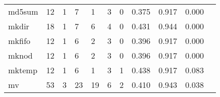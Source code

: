 \begin{longtable}{lp{1.2cm}p{1.2cm}p{1.2cm}p{1.2cm}p{1.2cm}p{1.2cm}p{1.2cm}p{1.2cm}p{1.2cm}p{1.2cm}}
md5sum    &                                    12 &                                                  1 &                                                  7 &                                                  1 &                                                  3 &                                                  0 &                                         0.375 &                                              0.917 &                                              0.000 \\
mkdir     &                                    18 &                                                  1 &                                                  7 &                                                  6 &                                                  4 &                                                  0 &                                         0.431 &                                              0.944 &                                              0.000 \\
mkfifo    &                                    12 &                                                  1 &                                                  6 &                                                  2 &                                                  3 &                                                  0 &                                         0.396 &                                              0.917 &                                              0.000 \\
mknod     &                                    12 &                                                  1 &                                                  6 &                                                  2 &                                                  3 &                                                  0 &                                         0.396 &                                              0.917 &                                              0.000 \\
mktemp    &                                    12 &                                                  1 &                                                  6 &                                                  1 &                                                  3 &                                                  1 &                                         0.438 &                                              0.917 &                                              0.083 \\
mv        &                                    53 &                                                  3 &                                                 23 &                                                 19 &                                                  6 &                                                  2 &                                         0.410 &                                              0.943 &                                              0.038 \\

\end{longtable}
